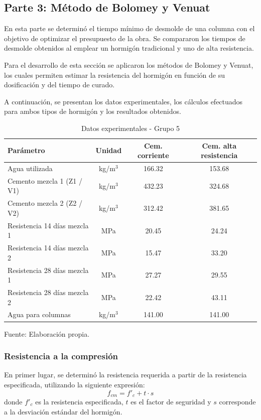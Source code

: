 \subsection*{Parte 3: Método de Bolomey y Venuat}

En esta parte se determinó el tiempo mínimo de desmolde de una columna con el objetivo de optimizar el presupuesto de la obra. Se compararon los tiempos de desmolde obtenidos al emplear un hormigón tradicional y uno de alta resistencia.  

Para el desarrollo de esta sección se aplicaron los métodos de Bolomey y Venuat, los cuales permiten estimar la resistencia del hormigón en función de su dosificación y del tiempo de curado.

A continuación, se presentan los datos experimentales, los cálculos efectuados para ambos tipos de hormigón y los resultados obtenidos.

\begin{table}[H]
\centering
\renewcommand{\arraystretch}{1.15}
\caption{Datos experimentales - Grupo 5}
\small
\begin{tabular}{lccc}
\hline
\textbf{Parámetro} & \textbf{Unidad} & \textbf{Cem. corriente} & \textbf{Cem. alta resistencia} \\ \hline
Agua utilizada & kg/m$^3$ & 166.32 & 153.68 \\
Cemento mezcla 1 (Z1 / V1) & kg/m$^3$ & 432.23 & 324.68 \\
Cemento mezcla 2 (Z2 / V2) & kg/m$^3$ & 312.42 & 381.65 \\
Resistencia 14 días mezcla 1 & MPa & 20.45 & 24.24 \\
Resistencia 14 días mezcla 2 & MPa & 15.47 & 33.20 \\
Resistencia 28 días mezcla 1 & MPa & 27.27 & 29.55 \\
Resistencia 28 días mezcla 2 & MPa & 22.42 & 43.11 \\
Agua para columnas & kg/m$^3$ & 141.00 & 141.00 \\ \hline
\end{tabular}
\begin{center}
Fuente: Elaboración propia.
\end{center}
\end{table}

\subsubsection*{Resistencia a la compresión}

En primer lugar, se determinó la resistencia requerida a partir de la resistencia especificada, utilizando la siguiente expresión:
\[
f_{cm} = f'_c + t \cdot s
\]
donde $f'_c$ es la resistencia especificada, $t$ es el factor de seguridad y $s$ corresponde a la desviación estándar del hormigón.

